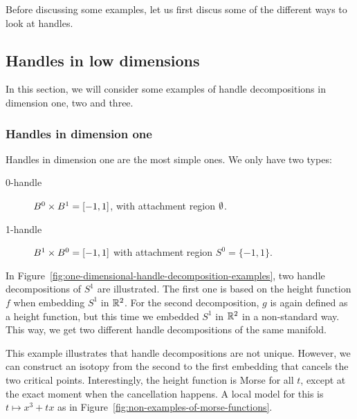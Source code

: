 Before discussing some examples, let us first discus some of the different ways to look at handles.


\subsection*{Handles in low dimensions}

In this section, we will consider some examples of handle decompositions in dimension one, two and three.

\subsubsection*{Handles in dimension one}
Handles in dimension one are the most simple ones. We only have two types:

\begin{description}
    \item[0-handle] $B^{0} \times B^{1} = [-1, 1]$, with attachment region $\emptyset$. \hfill {} 
        
    \item[1-handle]   $B^{1} \times  B^{0} = [-1, 1]$ with attachment region $S^{0} = \{-1, 1\}$.  \hfill {}
\end{description}

\begin{eg}
    In Figure~\ref{fig:one-dimensional-handle-decomposition-examples}, two handle decompositions of $S^{1}$ are illustrated.
    The first one is based on the height function $f$ when embedding $S^{1}$ in $\mathbb{R}^2$.
    For the second decomposition, $g$ is again defined as a height function, but this time we embedded $S^{1}$ in $ \mathbb{R}^2$ in a non-standard way.
    This way, we get two different handle decompositions of the same manifold.
\end{eg}
\begin{figure}[H]
    \centering
\end{figure}
This example illustrates that handle decompositions are not unique.
However, we can construct an isotopy from the second to the first embedding that cancels the two critical points.
Interestingly, the height function is Morse for all $t$, except at the exact moment when the cancellation happens.
A local model for this is $t\mapsto x^3 + tx$ as in Figure~\ref{fig:non-examples-of-morse-functions}.
\begin{figure}[H]
    \centering
\end{figure}


